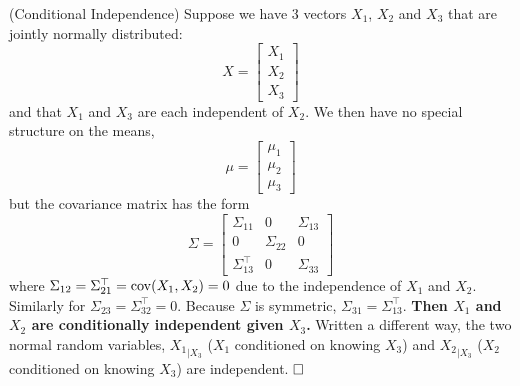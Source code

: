 \begin{keyfact} 
\label{keyfact2}
(Conditional Independence) Suppose we have 3 vectors $X_1$, $X_2$ and $X_3$ that are jointly normally distributed:
$$X = \begin{bmatrix} X_1 \\ X_2 \\ X_3 \end{bmatrix} $$
and that $X_1$ and $X_3$ are each independent of $X_2$. We then have no special structure on the means,
$$ \mu = \begin{bmatrix} \mu_1 \\ \mu_2 \\\mu_3\end{bmatrix} $$
but the covariance matrix has the form
$$ \Sigma = \left[ \begin{array}{ccc} \Sigma_{11} & 0 & \Sigma_{13} \\ 0 & \Sigma_{22} & 0 \\ \Sigma_{13}^\top & 0 & \Sigma_{33} \end{array}  \right]$$
where $\Sigma_{12}=\Sigma_{21}^\top=\mathrm{cov}(X_1,X_2)=0$ due to the independence of $X_1$ and $X_2$. Similarly for $\Sigma_{23}=\Sigma_{32}^\top=0$. Because $\Sigma$ is symmetric, $\Sigma_{31}=\Sigma_{13}^\top$.
\textbf{Then $X_1$ and $X_2$ are conditionally independent given $X_3$.} Written a different way, the two normal random variables, ${X_1}_{|X_3}$ ($X_1$ conditioned on knowing $X_3$) and  ${X_2}_{|X_3}$ ($X_2$ conditioned on knowing $X_3$) are independent.
 $\hfill \square$

\end{keyfact}

